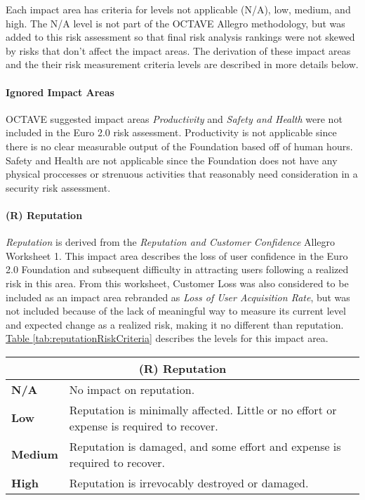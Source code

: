 \documentclass[12pt]{article} %
\newcommand{\hypertableref}[1]{\hyperref[#1]{Table \ref{#1}}}
\begin{document}
{Each impact area has criteria for levels not applicable (N/A), low, medium, and high. The N/A level is not part of the OCTAVE Allegro methodology, but was added to this risk assessment so that final risk analysis rankings were not skewed by risks that don't affect the impact areas. The derivation of these impact areas and the their risk measurement criteria levels are described in more details below.

\paragraph{Ignored Impact Areas}

OCTAVE suggested impact areas \textit{Productivity} and \textit{Safety and Health} were not included in the Euro 2.0 risk assessment. Productivity is not applicable since there is no clear measurable output of the Foundation based off of human hours. Safety and Health are not applicable since the Foundation does not have any physical proccesses or strenuous activities that reasonably need consideration in a security risk assessment.

\paragraph{(R) Reputation}

\textit{Reputation} is derived from the \textit{Reputation and Customer Confidence} Allegro Worksheet 1. This impact area describes the loss of user confidence in the Euro 2.0 Foundation and subsequent difficulty in attracting users following a realized risk in this area. From this worksheet, Customer Loss was also considered to be included as an impact area rebranded as \textit{Loss of User Acquisition Rate}, but was not included because of the lack of meaningful way to measure its current level and expected change as a realized risk, making it no different than reputation. \hypertableref{tab:reputationRiskCriteria} describes the levels for this impact area.

\begin{center}
\begin{tabular}{ | l | p{12cm} | }
  \hline
  \multicolumn{2}{|c|}{\textbf{(R) Reputation}}
  \\ \hline
  \textbf{N/A} & No impact on reputation.
  \\ \hline
  \textbf{Low} & Reputation is minimally affected. Little or no effort or expense is required to recover.
  \\ \hline
  \textbf{Medium} & Reputation is damaged, and some effort and expense is required to recover.
  \\ \hline
  \textbf{High} & Reputation is irrevocably destroyed or damaged.
  \\ \hline
\end{tabular}
\end{center}
\label{tab:reputationRiskCriteria}

}
\end{document}
